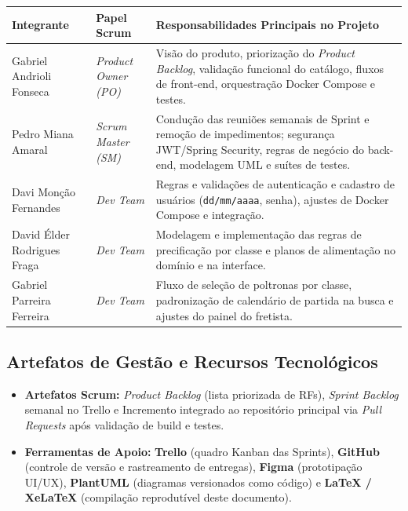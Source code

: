 \documentclass[12pt, a4paper]{article}
\begin{document}
\begin{table}[H]
\centering
\renewcommand{\arraystretch}{1.25}
\begin{tabularx}{\textwidth}{l l X}
\toprule
\textbf{Integrante} & \textbf{Papel Scrum} & \textbf{Responsabilidades Principais no Projeto} \\
\midrule
Gabriel Andrioli Fonseca & \textit{Product Owner (PO)} & Visão do produto, priorização do \textit{Product Backlog}, validação funcional do catálogo, fluxos de front-end, orquestração Docker Compose e testes. \\
Pedro Miana Amaral & \textit{Scrum Master (SM)} & Condução das reuniões semanais de Sprint e remoção de impedimentos; segurança JWT/Spring Security, regras de negócio do back-end, modelagem UML e suítes de testes. \\
Davi Monção Fernandes & \textit{Dev Team} & Regras e validações de autenticação e cadastro de usuários (\texttt{dd/mm/aaaa}, senha), ajustes de Docker Compose e integração. \\
David Élder Rodrigues Fraga & \textit{Dev Team} & Modelagem e implementação das regras de precificação por classe e planos de alimentação no domínio e na interface. \\
Gabriel Parreira Ferreira & \textit{Dev Team} & Fluxo de seleção de poltronas por classe, padronização de calendário de partida na busca e ajustes do painel do fretista. \\
\bottomrule
\end{tabularx}
\end{table}

\subsection{Artefatos de Gestão e Recursos Tecnológicos}
\begin{itemize}
    \item \textbf{Artefatos Scrum:} \textit{Product Backlog} (lista priorizada de RFs), \textit{Sprint Backlog} semanal no Trello e Incremento integrado ao repositório principal via \textit{Pull Requests} após validação de build e testes.
    \item \textbf{Ferramentas de Apoio:} \textbf{Trello} (quadro Kanban das Sprints), \textbf{GitHub} (controle de versão e rastreamento de entregas), \textbf{Figma} (prototipação UI/UX), \textbf{PlantUML} (diagramas versionados como código) e \textbf{LaTeX / XeLaTeX} (compilação reprodutível deste documento).
\end{itemize}
\end{document}
